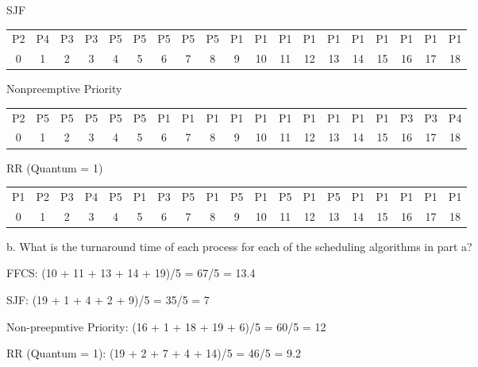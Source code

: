\documentclass[letterpaper, 10pt,DIV=13]{scrartcl}
\numberwithin{equation}{section} %
\numberwithin{figure}{section} %
\numberwithin{table}{section} %
\begin{document}
\begin{center}
    SJF
    
    \begin{tabular}{|c|c|c|c|c|c|c|c|c|c|c|c|c|c|c|c|c|c|c|}
        \hline
        P2 & P4 & P3 & P3 & P5 & P5 & P5 & P5 & P5 & P1 & P1 & P1 & P1 & P1 & P1 & P1 & P1 & P1 & P1 \\
        0 & 1 & 2 & 3 & 4 & 5 & 6 & 7 & 8 & 9 & 10 & 11 & 12 & 13 & 14 & 15 & 16 & 17 & 18 \\

        \hline
    \end{tabular}
\end{center}

\begin{center}
    Nonpreemptive Priority
    
    \begin{tabular}{|c|c|c|c|c|c|c|c|c|c|c|c|c|c|c|c|c|c|c|}
        \hline
        P2 & P5 & P5 & P5 & P5 & P5 & P1 & P1 & P1 & P1 & P1 & P1 & P1 & P1 & P1 & P1 & P3 & P3 & P4 \\
        0 & 1 & 2 & 3 & 4 & 5 & 6 & 7 & 8 & 9 & 10 & 11 & 12 & 13 & 14 & 15 & 16 & 17 & 18 \\

        \hline
    \end{tabular}
\end{center}

\begin{center}
    RR (Quantum = 1)
    
    \begin{tabular}{|c|c|c|c|c|c|c|c|c|c|c|c|c|c|c|c|c|c|c|}
        \hline
        P1 & P2 & P3 & P4 & P5 & P1 & P3 & P5 & P1 & P5 & P1 & P5 & P1 & P5 & P1 & P1 & P1 & P1 & P1 \\
        0 & 1 & 2 & 3 & 4 & 5 & 6 & 7 & 8 & 9 & 10 & 11 & 12 & 13 & 14 & 15 & 16 & 17 & 18 \\
        \hline
    \end{tabular}
\end{center}
\vspace{\baselineskip}
b. What is the turnaround time of each process for each of the scheduling algorithms in part a?

FFCS: (10 + 11 + 13 + 14 + 19)/5 = 67/5 = 13.4 

SJF: (19 + 1 + 4 + 2 + 9)/5 = 35/5 = 7 

Non-preepmtive Priority: (16 + 1 + 18 + 19 + 6)/5 = 60/5 = 12

RR (Quantum = 1): (19 + 2 + 7 + 4 + 14)/5 = 46/5 = 9.2 
\end{document}
